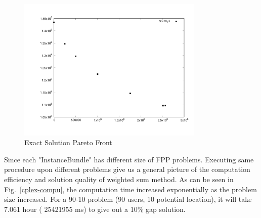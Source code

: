 \documentclass[10pt,journal,compsoc]{IEEEtran}
\newcommand{\Fig}[1]{Fig.~\ref{#1}}
\begin{document}
\begin{figure}[ht]
\centerline{\includegraphics[width=3.5in]{9010pf.pdf}}
\caption{Exact Solution Pareto Front} 
\label{espf}
\end{figure}
Since each "InstanceBundle" has different size of FPP problems. Executing same procedure upon different problems give us a general picture of the computation efficiency and solution quality of weighted sum method.
As can be seen in \Fig{cplex-compu}, the computation time increased exponentially as the problem size increased. 
For a 90-10 problem (90 users, 10 potential location), it will take 7.061 hour ( 25421955 ms) to give out a 10\% gap  solution. 
\end{document}
